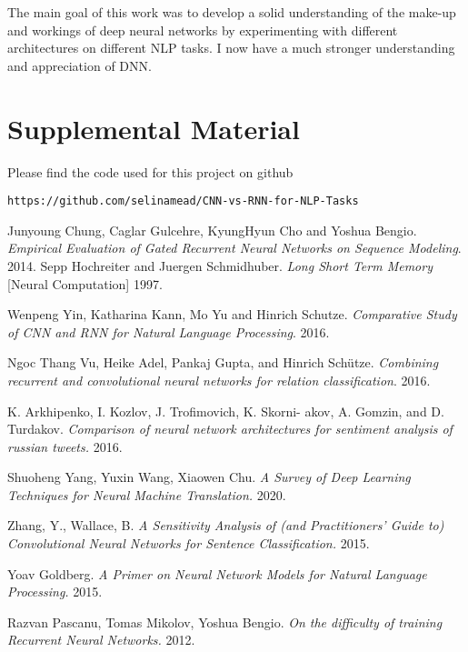 \documentclass[twocolumn,12pt]{asme2ej}
\begin{document}
The main goal of this work was to develop a solid understanding of the make-up and workings of deep neural networks by experimenting with different architectures on different NLP tasks. I now have a much stronger understanding and appreciation of DNN.

\section{Supplemental Material} Please find the code used for this project on github \begin{verbatim} 
https://github.com/selinamead/CNN-vs-RNN-for-NLP-Tasks
\end{verbatim}

\newpage
\begin{thebibliography}{9}
Junyoung Chung, Caglar Gulcehre, KyungHyun Cho and Yoshua Bengio.
\textit{Empirical Evaluation of Gated Recurrent Neural Networks on Sequence Modeling}. 
2014.
Sepp Hochreiter and Juergen Schmidhuber. 
\textit{Long Short Term Memory} [Neural Computation] 
1997.

Wenpeng Yin, Katharina Kann, Mo Yu and Hinrich Schutze. 
\textit{Comparative Study of CNN and RNN for Natural Language Processing}. 
2016.

 Ngoc Thang Vu, Heike Adel, Pankaj Gupta, and Hinrich Schütze.
\textit{Combining recurrent and convolutional neural networks for relation classification}. 
2016.

K. Arkhipenko, I. Kozlov, J. Trofimovich, K. Skorni- akov, A. Gomzin, and D. Turdakov.
\textit{Comparison of neural network architectures for sentiment analysis of russian tweets.} 
2016.

Shuoheng Yang, Yuxin Wang, Xiaowen Chu.
\textit{A Survey of Deep Learning Techniques for Neural Machine Translation.} 
2020.

Zhang, Y., Wallace, B. 
\textit{A Sensitivity Analysis of (and Practitioners’ Guide to) Convolutional Neural Networks for Sentence Classification.} 
2015.

Yoav Goldberg.
\textit{A Primer on Neural Network Models for Natural Language Processing.} 
2015.

Razvan Pascanu, Tomas Mikolov, Yoshua Bengio.
\textit{On the difficulty of training Recurrent Neural Networks.} 
2012.


\end{thebibliography}



\end{document}
